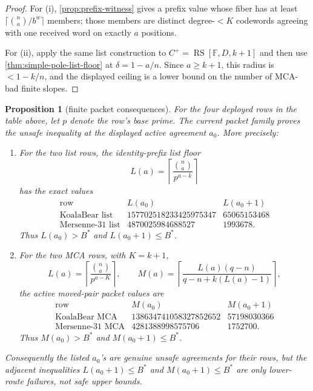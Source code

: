 \documentclass[a4paper,11pt]{amsart}
\newtheorem{proposition}[proposition]{Proposition}
\theoremstyle{remark}
\newcommand{\F}{\mathbb F}
\newcommand{\RS}{\operatorname{RS}}
\begin{document}
\begin{proof}
For (i), \cref{prop:prefix-witness} gives a prefix value whose fiber has at least \(\lceil\binom na/b^w\rceil\) members; those members are distinct degree-\(<K\) codewords agreeing with one received word on exactly \(a\) positions.

For (ii), apply the same list construction to \(C^+=\RS[\F,D,k+1]\) and then use \cref{thm:simple-pole-list-floor} at \(\delta=1-a/n\).  Since \(a\ge k+1\), this radius is \(<1-k/n\), and the displayed ceiling is a lower bound on the number of MCA-bad finite slopes.
\end{proof}

\begin{proposition}[finite packet consequences]\label{prop:finite-packet-consequences}
For the four deployed rows in the table above, let \(p\) denote the row's base prime.  The current packet family proves the unsafe inequality at the displayed active agreement \(a_0\).  More precisely:
\begin{enumerate}[label=\textup{(\roman*)}]
\item For the two list rows, the identity-prefix list floor
\[
        L(a)=\left\lceil\frac{\binom na}{p^{a-k}}\right\rceil
\]
has the exact values
\[
\begin{array}{c|cc}
\text{row} & L(a_0) & L(a_0+1)\\
\hline
\text{KoalaBear list} & 157702518233425975347 & 65065153468\\
\text{Mersenne-31 list} & 4870025984688527 & 1993678 .
\end{array}
\]
Thus \(L(a_0)>B^*\) and \(L(a_0+1)\le B^*\).
\item For the two MCA rows, with \(K=k+1\),
\[
        L(a)=\left\lceil\frac{\binom na}{p^{a-K}}\right\rceil,
        \qquad
        M(a)=\left\lceil \frac{L(a)(q-n)}{q-n+k(L(a)-1)}\right\rceil ,
\]
the active moved-pair packet values are
\[
\begin{array}{c|cc}
\text{row} & M(a_0) & M(a_0+1)\\
\hline
\text{KoalaBear MCA} & 138634741058327852652 & 57198030366\\
\text{Mersenne-31 MCA} & 4281388998575706 & 1752700 .
\end{array}
\]
Thus \(M(a_0)>B^*\) and \(M(a_0+1)\le B^*\).
\end{enumerate}
Consequently the listed \(a_0\)'s are genuine unsafe agreements for their rows, but the adjacent inequalities \(L(a_0+1)\le B^*\) and \(M(a_0+1)\le B^*\) are only lower-route failures, not safe upper bounds.
\end{proposition}
\end{document}
